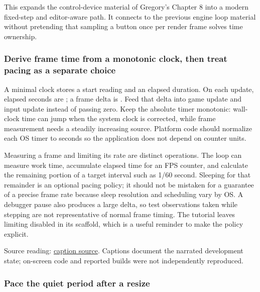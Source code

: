This expands the control-device material of Gregory's Chapter 8 into a modern fixed-step and editor-aware path. It connects to the previous engine loop material without pretending that sampling a button once per render frame solves time ownership.

\subsubsection{Derive frame time from a monotonic clock, then treat pacing as a separate choice}\label{05-engine-i-ch014-derive-frame-time-from-a-monotonic-clock-then-treat-pacing-as-a-separate-choice}

\hypertarget{05-engine-i-ch014-derive-frame-time-from-a-monotonic-clock-then-treat-pacing-as-a-separate-choice}{}

A minimal clock stores a start reading and an elapsed duration. On each update, elapsed seconds are ; a frame delta is . Feed that delta into game update and input update instead of passing zero. Keep the absolute timer monotonic: wall-clock time can jump when the system clock is corrected, while frame measurement needs a steadily increasing source. Platform code should normalize each OS timer to seconds so the application does not depend on counter units.

Measuring a frame and limiting its rate are distinct operations. The loop can measure work time, accumulate elapsed time for an FPS counter, and calculate the remaining portion of a target interval such as 1/60 second. Sleeping for that remainder is an optional pacing policy; it should not be mistaken for a guarantee of a precise frame rate because sleep resolution and scheduling vary by OS. A debugger pause also produces a large delta, so test observations taken while stepping are not representative of normal frame timing. The tutorial leaves limiting disabled in its scaffold, which is a useful reminder to make the policy explicit.

Source reading: \href{https://www.youtube.com/watch?v=bbPdEkRaVNE}{caption source}. Captions document the narrated development state; on-screen code and reported builds were not independently reproduced.

\subsubsection{Pace the quiet period after a resize}\label{05-engine-i-ch014-pace-the-quiet-period-after-a-resize}

